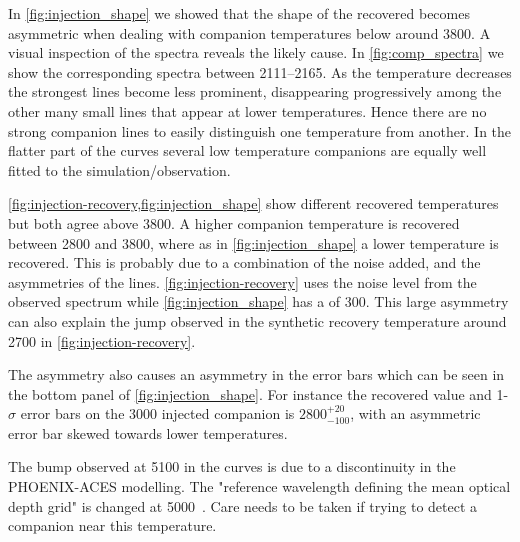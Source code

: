In \cref{fig:injection_shape} \textrm{we} showed that the shape of the recovered \textchisquared{} becomes asymmetric when dealing with companion temperatures below around 3800\K{}.
A visual inspection of the spectra reveals the likely cause.
In \cref{fig:comp_spectra} \textrm{we} show the corresponding spectra between 2111--2165\nm{}.
As the temperature decreases the strongest lines become less prominent, disappearing progressively among the other many small lines that appear at lower temperatures.
Hence there are no strong companion lines to easily distinguish one temperature from another.
In the flatter part of the \textchisquared{} curves several low temperature companions are equally well fitted to the simulation/observation.

\cref{fig:injection-recovery,fig:injection_shape} show different recovered temperatures but both agree above 3800\K{}.
A higher companion temperature is recovered between 2800 and 3800\K{}, where as in \cref{fig:injection_shape} a lower temperature is recovered.
This is probably due to a combination of the noise added, and the asymmetries of the \textchisquared{} lines.
\cref{fig:injection-recovery} uses the noise level from the observed spectrum while \cref{fig:injection_shape} has a \snr{} of 300.
This large asymmetry can also explain the jump observed in the synthetic recovery temperature around 2700\K{} in \cref{fig:injection-recovery}.

The asymmetry also causes an asymmetry in the \textchisquared{} error bars which can be seen in the bottom panel of \cref{fig:injection_shape}.
For instance the recovered value and 1-\(\sigma\) error bars on the 3000\K{} injected companion is \(2800 ^{+20}_{-100}\), with an asymmetric error bar skewed towards lower temperatures.

The bump observed at 5100\K{} in the \textchisquared{} curves is due to a discontinuity in the {PHOENIX-ACES} modelling.
The "reference wavelength defining the mean optical depth grid" is changed at 5000\K{}~\citep[][Sect. 2.3]{husser_new_2013}.
Care needs to be taken if trying to detect a companion near this temperature.

